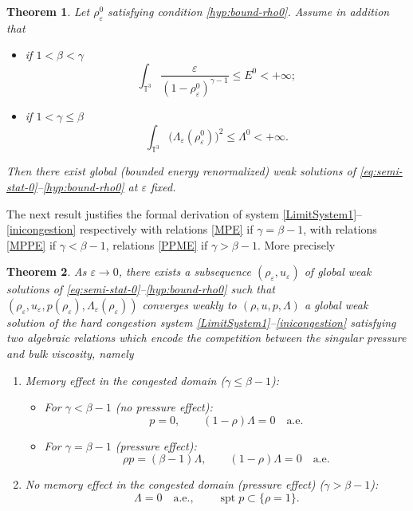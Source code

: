 \documentclass[JEP,XML,SOM,Unicode,NoEqCountersInSection]{cedram}
\newcommand{\<}{\bigl\langle}
\renewcommand{\>}{\bigr\rangle}
\DeclareMathOperator{\spt}{spt}
\newtheorem{thm}{Theorem}[section]
\theoremstyle{definition}
\theoremstyle{remark}
\newcommand{\TT}{\mathbb{T}^3}
\let\ep\varepsilon
\begin{document}
\pagebreak[2]
\begin{thm}{\label{thm-ep}}
Let $\rho_\ep^0$ satisfying condition \eqref{hyp:bound-rho0}.
Assume in addition that
\begin{itemize}
\item if $1< \beta< \gamma$
\begin{equation}\label{hyp:energy-t0-C1}
\int_{\TT}{\dfrac{\ep}{(1-\rho^0_\ep)^{\gamma-1}}}\leq E^0 <+\infty;
\end{equation}
\item if $1 < \gamma \leq \beta$
\begin{equation}\label{hyp:energy-t0-C2}
\int_{\TT}{\big(\Lambda_\ep(\rho_\ep^0)\big)^2}
\leq \Lambda^0 < +\infty.
\end{equation}
\end{itemize} 
Then there exist global (bounded energy renormalized) weak solutions of
\eqref{eq:semi-stat-0}--\eqref{hyp:bound-rho0}
at $\ep$ fixed.
\end{thm}

The next result justifies the formal derivation of system \eqref{LimitSystem1}--\eqref{inicongestion} respectively with relations \eqref{MPE} if $\gamma= \beta-1$,
with relations \eqref{MPPE} if $\gamma<\beta-1$, relations
\eqref{PPME} if $\gamma>\beta-1$.
More precisely

\begin{thm}{\label{thm-limit}} As $\ep \rightarrow 0$, there exists a subsequence $(\rho_\ep,u_\ep)$ of global weak solutions of \eqref{eq:semi-stat-0}--\eqref{hyp:bound-rho0} such that $(\rho_\varepsilon, u_\varepsilon, p(\rho_\varepsilon), \Lambda_\varepsilon(\rho_\varepsilon))$ converges weakly to $(\rho,u, p, \Lambda)$ a global weak solution of the hard congestion system \eqref{LimitSystem1}--\eqref{inicongestion} satisfying two algebraic relations which encode the competition between the singular pressure and bulk viscosity, namely
\begin{enumerate}\renewcommand{\theenumi}{\Roman{enumi}}
\item
Memory effect in the congested domain {\rm ($\gamma \le \beta -1$)}:
\begin{itemize}
\item For $\gamma < \beta - 1$ {\rm (no pressure effect)}:
$$p=0, \qquad (1-\rho)\Lambda = 0 \quad \text{a.e.}$$ 
\item For $\gamma= \beta - 1$ {\rm (pressure effect)}:
$$\rho p= (\beta-1) \Lambda, \qquad (1-\rho)\Lambda = 0 \quad \text{a.e.}$$
\end{itemize} 

\item
No memory effect in the congested domain {\rm (pressure effect)}
{\rm ($\gamma > \beta -1$)}:
$$\Lambda= 0 \quad \text{a.e.}, \qquad \spt p \subset \{\rho =1\}.$$ 
\end{enumerate}
\end{thm}
\end{document}
